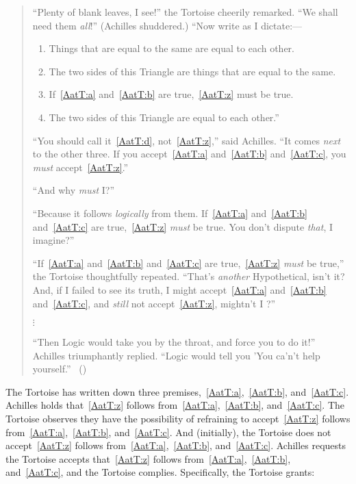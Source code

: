 \begin{note}
  \begin{quote}
    ``Plenty of blank leaves, I see!'' the Tortoise cheerily remarked.
    ``We shall need them \emph{all}!''
    (Achilles shuddered.)
    ``Now write as I dictate:---

    \begin{enumerate}[label=(\emph{\Alph*}), ref=\emph{\Alph*}]
    \item
      \label{AatT:a}
      Things that are equal to the same are equal to each other.
    \item
      \label{AatT:b}
      The two sides of this Triangle are things that are equal to the same.
    \item
      \label{AatT:c}
      If~\ref{AatT:a} and~\ref{AatT:b} are true,~\ref{AatT:z} must be true.
      \setcounter{enumi}{25}
    \item
      \label{AatT:z}
      The two sides of this Triangle are equal to each other.''
    \end{enumerate}

    ``You should call it~\ref{AatT:d}, not~\ref{AatT:z},'' said Achilles.
    ``It comes \emph{next} to the other three.
    If you accept~\ref{AatT:a} and~\ref{AatT:b} and~\ref{AatT:c}, you \emph{must} accept~\ref{AatT:z}.''

    ``And why \emph{must} I?''

    ``Because it follows \emph{logically} from them.
    If~\ref{AatT:a} and~\ref{AatT:b} and~\ref{AatT:c} are true,~\ref{AatT:z} \emph{must} be true.
    You don't dispute \emph{that}, I imagine?''

    ``If~\ref{AatT:a} and~\ref{AatT:b} and~\ref{AatT:c} are true,~\ref{AatT:z} \emph{must} be true,'' the Tortoise thoughtfully repeated.
    ``That's \emph{another} Hypothetical, isn't it?
    And, if I failed to see its truth, I might accept~\ref{AatT:a} and~\ref{AatT:b} and~\ref{AatT:c}, and \emph{still} not accept~\ref{AatT:z}, mightn't I ?''

    \mbox{}\hfill\(\vdots\)\hfill\mbox{}

    ``Then Logic would take you by the throat, and force you to do it!''
    Achilles triumphantly replied.
    ``Logic would tell you 'You ca'n't help yourself.''%
    \mbox{ }\hfill\mbox{(\citeyear[279--280]{Carroll:1895uj})}
  \end{quote}

  The Tortoise has written down three premises,~\ref{AatT:a},~\ref{AatT:b}, and~\ref{AatT:c}.
  Achilles holds that~\ref{AatT:z} follows from~\ref{AatT:a},~\ref{AatT:b}, and~\ref{AatT:c}.
  The Tortoise observes they have the possibility of refraining to accept~\ref{AatT:z} follows from~\ref{AatT:a},~\ref{AatT:b}, and~\ref{AatT:c}.
  And (initially), the Tortoise does not accept~\ref{AatT:z} follows from~\ref{AatT:a},~\ref{AatT:b}, and~\ref{AatT:c}.
  Achilles requests the Tortoise accepts that~\ref{AatT:z} follows from~\ref{AatT:a},~\ref{AatT:b}, and~\ref{AatT:c}, and the Tortoise complies.
  Specifically, the Tortoise grants:


\end{note}
